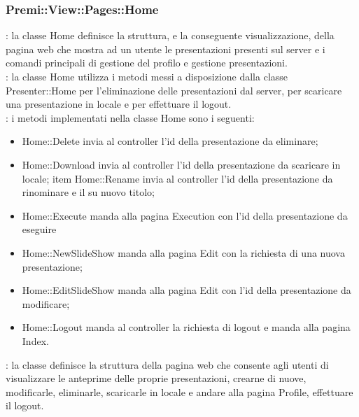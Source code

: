 {		\subsubsection{Premi::View::Pages::Home}{
			\textbf{\tipo}: la classe Home definisce la struttura, e la conseguente visualizzazione, della pagina web che mostra ad un utente le presentazioni presenti sul server e i comandi principali di gestione del profilo e gestione presentazioni.\\	
			\textbf{\relaz}: la classe Home utilizza i metodi messi a disposizione dalla classe Presenter::Home per l'eliminazione delle presentazioni dal server, per scaricare una presentazione in locale e per effettuare il logout.\\
			\textbf{\interfacce}: i metodi implementati nella classe Home sono i seguenti:
			\begin{itemize}
				\item Home::Delete invia al controller l'id della presentazione da eliminare;
				\item Home::Download invia al controller l'id della presentazione da scaricare in locale;
				item Home::Rename invia al controller l'id della presentazione da rinominare e il su nuovo titolo;
				\item Home::Execute manda alla pagina Execution con l'id della presentazione da eseguire
				\item Home::NewSlideShow manda alla pagina Edit con la richiesta di una nuova presentazione;
				\item Home::EditSlideShow manda alla pagina Edit con l'id della presentazione da modificare;
				\item Home::Logout manda al controller la richiesta di logout e manda alla pagina Index.				
			\end{itemize} 
			\textbf{\attivita}: la classe definisce la struttura della pagina web che consente agli utenti di visualizzare le anteprime delle proprie presentazioni, crearne di nuove, modificarle, eliminarle, scaricarle in locale e andare alla pagina Profile, effettuare il logout.\\
		}
}
